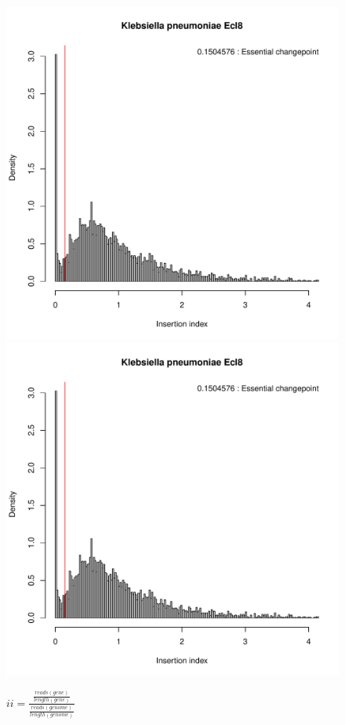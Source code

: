 \documentclass[a4paper,10pt]{article}
\begin{document}
\begin{figure}
\includegraphics[scale=0.2, page=11]{mixtools-no-reads.pdf}
\includegraphics[scale=0.2, page=12]{mixtools-no-reads.pdf}
\caption{$ii=\frac{\frac{reads(gene)}{length(gene)}}{\frac{reads(genome)}{length(genome)}}$\newline
}
\end{figure}
\end{document}
